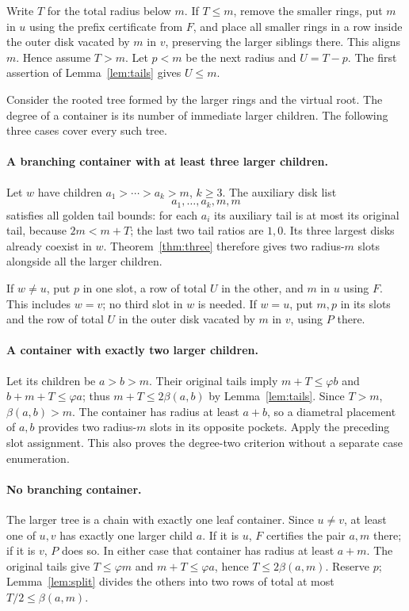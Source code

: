 \documentclass[11pt]{article}
\theoremstyle{remark}
\newcommand{\ph}{\varphi}
\newcommand{\bp}{\beta}
\begin{document}
Write $T$ for the total radius below $m$. If $T\le m$, remove the
smaller rings, put $m$ in $u$ using the prefix certificate from $F$,
and place all smaller rings in a row inside the outer disk vacated
by $m$ in $v$, preserving the larger siblings there. This aligns $m$.
Hence assume $T>m$. Let $p<m$ be the next radius and $U=T-p$.
The first assertion of Lemma~\ref{lem:tails} gives $U\le m$.

Consider the rooted tree formed by the larger rings and the virtual
root. The degree of a container is its number of immediate larger
children. The following three cases cover every such tree.

\paragraph{A branching container with at least three larger children.}
Let $w$ have children $a_1>\cdots>a_k>m$, $k\ge3$. The auxiliary
disk list
\[
 a_1,\ldots,a_k,m,m
\]
satisfies all golden tail bounds: for each $a_i$ its auxiliary tail
is at most its original tail, because $2m<m+T$; the last two tail
ratios are $1,0$. Its three largest disks already coexist in $w$.
Theorem~\ref{thm:three} therefore gives two radius-$m$ slots alongside
all the larger children.

If $w\ne u$, put $p$ in one slot, a row of total $U$ in the other,
and $m$ in $u$ using $F$. This includes $w=v$; no third slot in $w$
is needed. If $w=u$, put $m,p$ in its slots and the row of total $U$
in the outer disk vacated by $m$ in $v$, using $P$ there.

\paragraph{A container with exactly two larger children.}
Let its children be $a>b>m$. Their original tails imply
$m+T\le\ph b$ and $b+m+T\le\ph a$; thus
$m+T\le2\bp(a,b)$ by Lemma~\ref{lem:tails}. Since $T>m$,
$\bp(a,b)>m$. The container has radius at least $a+b$, so a diametral
placement of $a,b$ provides two radius-$m$ slots in its opposite pockets.
Apply the preceding slot assignment. This also proves the degree-two
criterion without a separate case enumeration.

\paragraph{No branching container.}
The larger tree is a chain with exactly one leaf container. Since
$u\ne v$, at least one of $u,v$ has exactly one larger child $a$.
If it is $u$, $F$ certifies the pair $a,m$ there; if it is $v$, $P$
does so. In either case that container has radius at least $a+m$.
The original tails give $T\le\ph m$ and $m+T\le\ph a$, hence
$T\le2\bp(a,m)$. Reserve $p$; Lemma~\ref{lem:split} divides
the others into two rows of total at most $T/2\le\bp(a,m)$.
\end{document}
